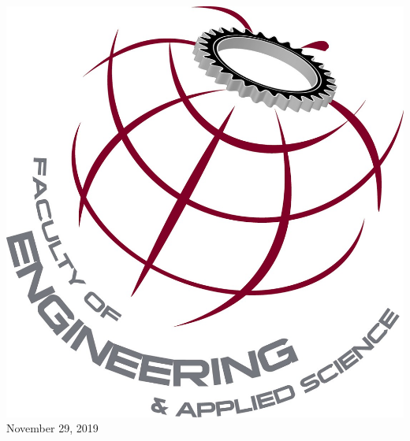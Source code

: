 \includegraphics[scale=0.4]{media/EngLogo.jpg}\\[1cm] %




{\large November 29, 2019}\\[2cm] %

\vfill %
